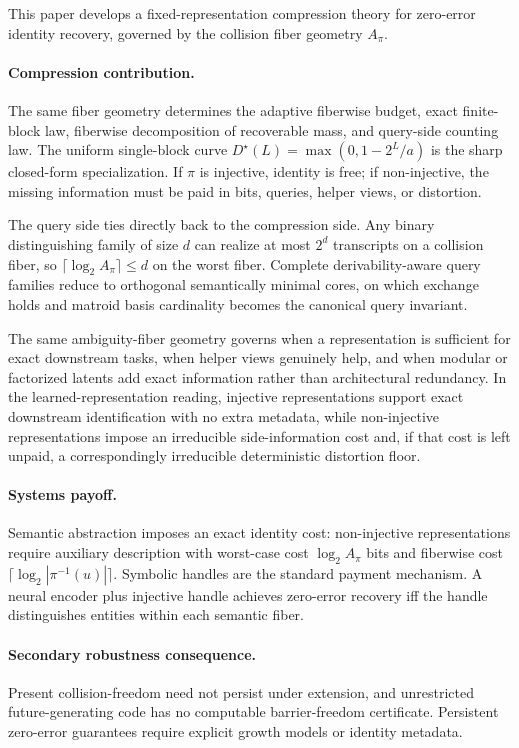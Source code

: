 This paper develops a fixed-representation compression theory for zero-error identity recovery, governed by the collision fiber geometry $A_\pi$.

\paragraph{Compression contribution.}
The same fiber geometry determines the adaptive fiberwise budget, exact finite-block law, fiberwise decomposition of recoverable mass, and query-side counting law. The uniform single-block curve $D^\star(L)=\max(0,1-2^L/a)$ is the sharp closed-form specialization. If $\pi$ is injective, identity is free; if non-injective, the missing information must be paid in bits, queries, helper views, or distortion.

The query side ties directly back to the compression side. Any binary distinguishing family of size $d$ can realize at most $2^d$ transcripts on a collision fiber, so $\lceil \log_2 A_\pi \rceil \le d$ on the worst fiber. Complete derivability-aware query families reduce to orthogonal semantically minimal cores, on which exchange holds and matroid basis cardinality becomes the canonical query invariant.

The same ambiguity-fiber geometry governs when a representation is sufficient for exact downstream tasks, when helper views genuinely help, and when modular or factorized latents add exact information rather than architectural redundancy. In the learned-representation reading, injective representations support exact downstream identification with no extra metadata, while non-injective representations impose an irreducible side-information cost and, if that cost is left unpaid, a correspondingly irreducible deterministic distortion floor.

\paragraph{Systems payoff.}
Semantic abstraction imposes an exact identity cost: non-injective representations require auxiliary description with worst-case cost $\log_2 A_\pi$ bits and fiberwise cost $\lceil \log_2 |\pi^{-1}(u)| \rceil$. Symbolic handles are the standard payment mechanism. A neural encoder plus injective handle achieves zero-error recovery iff the handle distinguishes entities within each semantic fiber. 

\paragraph{Secondary robustness consequence.}
Present collision-freedom need not persist under extension, and unrestricted future-generating code has no computable barrier-freedom certificate. Persistent zero-error guarantees require explicit growth models or identity metadata.

